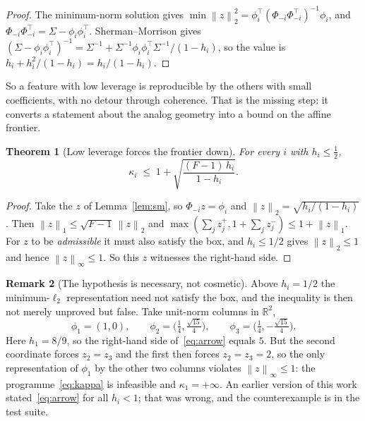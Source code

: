 \documentclass[preprint,12pt]{elsarticle}
\newtheorem{theorem}{Theorem}[section]
\theoremstyle{definition}
\newtheorem{remark}[theorem]{Remark}
\newcommand{\R}{\mathbb{R}}
\newcommand{\norm}[1]{\left\lVert #1 \right\rVert}
\begin{document}
\begin{proof}
The minimum-norm solution gives
$\min\norm{z}_2^2=\phi_i^{\top}(\Phi_{-i}\Phi_{-i}^{\top})^{-1}\phi_i$, and
$\Phi_{-i}\Phi_{-i}^{\top}=\Sigma-\phi_i\phi_i^{\top}$. Sherman--Morrison gives
$(\Sigma-\phi_i\phi_i^{\top})^{-1}=\Sigma^{-1}+\Sigma^{-1}\phi_i\phi_i^{\top}\Sigma^{-1}/(1-h_i)$,
so the value is $h_i+h_i^2/(1-h_i)=h_i/(1-h_i)$.
\end{proof}

So a feature with low leverage is reproducible by the others with small coefficients, with no
detour through coherence. That is the missing step: it converts a statement about the analog
geometry into a bound on the affine frontier.

\begin{theorem}[Low leverage forces the frontier down]
\label{thm:arrow}
For every $i$ with $h_i\le\tfrac12$,
\begin{equation}
  \kappa_i\;\le\;1+\sqrt{\frac{(F-1)\,h_i}{1-h_i}} .
  \label{eq:arrow}
\end{equation}
\end{theorem}

\begin{proof}
Take the $z$ of Lemma~\ref{lem:sm}, so $\Phi_{-i}z=\phi_i$ and
$\norm{z}_2=\sqrt{h_i/(1-h_i)}$. Then $\norm{z}_1\le\sqrt{F-1}\,\norm{z}_2$ and
$\max(\sum_jz^{+}_j,1+\sum_jz^{-}_j)\le1+\norm{z}_1$. For $z$ to be \emph{admissible} it must also
satisfy the box, and $h_i\le1/2$ gives $\norm{z}_2\le1$ and hence $\norm{z}_\infty\le1$. So this
$z$ witnesses the right-hand side.
\end{proof}

\begin{remark}[The hypothesis is necessary, not cosmetic]
\label{rem:arrow-hyp}
Above $h_i=1/2$ the minimum-$\ell_2$ representation need not satisfy the box, and the inequality
is then not merely unproved but false. Take unit-norm columns in $\R^2$,
\[
  \phi_1=(1,0),\qquad
  \phi_2=\Big(\tfrac14,\tfrac{\sqrt{15}}4\Big),\qquad
  \phi_3=\Big(\tfrac14,-\tfrac{\sqrt{15}}4\Big).
\]
Here $h_1=8/9$, so the right-hand side of~\eqref{eq:arrow} equals $5$. But the second coordinate
forces $z_2=z_3$ and the first then forces $z_2=z_3=2$, so the only representation of $\phi_1$ by
the other two columns violates $\norm{z}_\infty\le1$: the programme~\eqref{eq:kappa} is infeasible
and $\kappa_1=+\infty$. An earlier version of this work stated~\eqref{eq:arrow} for all $h_i<1$;
that was wrong, and the counterexample is in the test suite.
\end{remark}
\end{document}
